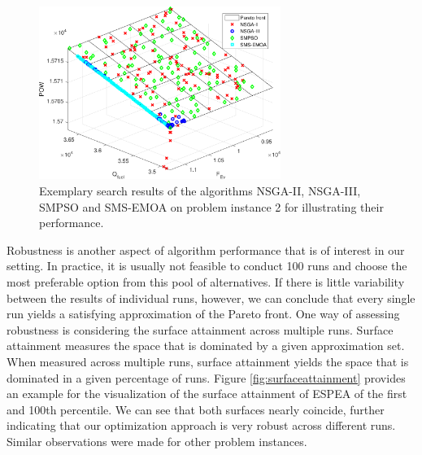 \begin{figure}
\centering
\includegraphics[width=0.7\textwidth]{figures/example2_cropped.pdf}
\caption{Exemplary search results of the algorithms NSGA-II, NSGA-III, SMPSO and SMS-EMOA on problem instance 2 for illustrating their performance.}
\label{fig:exruns2}
\end{figure}

Robustness is another aspect of algorithm performance that is of interest in our setting. In practice, it is usually not feasible to conduct 100 runs and choose the most preferable option from this pool of alternatives. If there is little variability between the results of individual runs, however, we can conclude that every single run yields a satisfying approximation of the Pareto front. One way of assessing robustness is considering the surface attainment \cite{fonseca1996performance} across multiple runs. Surface attainment measures the space that is dominated by a given approximation set. When measured across multiple runs, surface attainment yields the space that is dominated in a given percentage of runs. Figure \ref{fig:surfaceattainment} provides an example for the visualization of the surface attainment of ESPEA of the first and 100th percentile. We can see that both surfaces nearly coincide, further indicating that our optimization approach is very robust across different runs. Similar observations were made for other problem instances.

